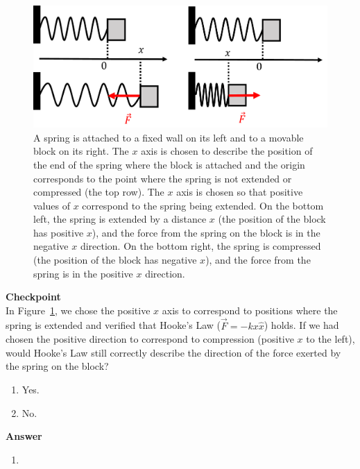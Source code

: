 \begin{figure}[!htbp]
\centering
\includegraphics[width=0.7\linewidth]{files/spring-b00122b55ed30b778274a7ba08b20d91.png}
\caption[]{A spring is attached to a fixed wall on its left and to a movable block on its right. The $x$ axis is chosen to describe the position of the end of the spring where the block is attached and the origin corresponds to the point where the spring is not extended or compressed (the top row). The $x$ axis is chosen so that positive values of $x$ correspond to the spring being extended. On the bottom left, the spring is extended by a distance $x$ (the position of the block has positive $x$), and the force from the spring on the block is in the negative $x$ direction. On the bottom right, the spring is compressed (the position of the block has negative $x$), and the force from the spring is in the positive $x$ direction.}
\label{fig:newtonslaws:spring}
\end{figure}

\begin{framed}
\textbf{Checkpoint}\\
In Figure~\ref{fig:newtonslaws:spring}, we chose the positive $x$ axis to correspond to positions where the spring is extended and verified that Hooke's Law ($\vec F= -kx\hat x$) holds. If we had chosen the positive direction to correspond to compression (positive $x$ to the left), would Hooke's Law still correctly describe the direction of the force exerted by the spring on the block?

\begin{enumerate}
\item Yes.
\item No.
\end{enumerate}

\begin{framed}
\textbf{Answer}\\
\begin{enumerate}
\item
\end{enumerate}
\end{framed}
\end{framed}

